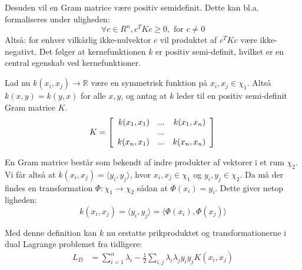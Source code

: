 \documentclass{article}
\begin{document}
Desuden vil en Gram matrice være positiv semidefinit. Dette kan bl.a. formaliseres under uligheden:
\begin{equation}
\forall c\in R^n,c^TKc\geq 0,\text{ for }c\neq 0
\end{equation}
Altså: for enhver vilkårlig ikke-nulvektor $c$ vil produktet af $c^TKc$ være ikke-negativt. Det følger at kernefunktionen $k$ er positiv semi-definit, hvilket er en central egenskab ved kernefunktioner.


Lad nu $k(x_i,x_j)\rightarrow\mathbb{R}$ være en symmetrisk funktion på $x_i,x_j\in \chi_1$. Altså $k(x,y)=k(y,x)$ for alle $x,y$, og antag at $k$ leder til en positiv semi-definit Gram matrice $K$.
\begin{equation}
K=\left[\begin{array}{r r r}
k(x_1,x_1) & ... &k(x_1,x_n)\\
& ... & \\
k(x_n,x_1) & ... &k(x_n,x_n)\\
\end{array}\right]\\
\end{equation}

En Gram matrice består som bekendt af indre produkter af vektorer i et rum $\chi_2$. Vi får altså at $k(x_i,x_j)=\langle y_i,y_j \rangle$, hvor $x_i,x_j\in\chi_1$ og $y_i,y_j\in\chi_2$. Da må der findes en transformation $\Phi:\chi_1\rightarrow\chi_2$ sådan at $\Phi(x_i)=y_i$. Dette giver netop ligheden:
\begin{equation}
k(x_i,x_j) = \langle y_i, y_j \rangle = \langle \Phi(x_i),\Phi(x_j) \rangle
\end{equation}


Med denne definition kan $k$ nu erstatte prikproduktet og transformationerne i dual Lagrange problemet fra tidligere:
\begin{align*}
L_D&=\sum_{i=1}^{n}\lambda_i-\frac{1}{2}\sum_{i,j}\lambda_i\lambda_j y_iy_jK(x_i,x_j)
\end{align*}
\end{document}

